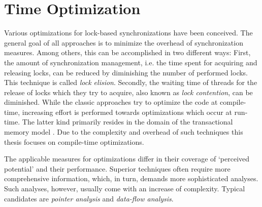\section{Time Optimization}
Various optimizations for lock-based synchronizations have been conceived. The general goal of all approaches is to minimize the overhead of synchronization measures. Among others, this can be accomplished in two different ways: First, the amount of synchronization management, i.e. the time spent for acquiring and releasing locks, can be reduced by diminishing the number of performed locks. This technique is called \textit{lock elision}. Secondly, the waiting time of threads for the release of locks which they try to acquire, also known as \textit{lock contention}, can be diminished. While the classic approaches try to optimize the code at compile-time, increasing effort is performed towards optimizations which occur at run-time. The latter kind primarily resides in the domain of the transactional memory model \cite{SpeculativeLockElision}\cite{ARuntimeSystem}. Due to the complexity and overhead of such techniques this thesis focuses on compile-time optimizations.

The applicable measures for optimizations differ in their coverage of `perceived potential' and their performance. Superior techniques often require more comprehensive information, which, in turn, demands more sophisticated analyses. Such analyses, however, usually come with an increase of complexity. Typical candidates are \textit{pointer analysis} and \textit{data-flow analysis}.

